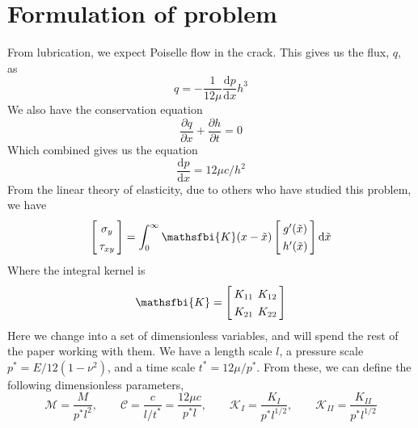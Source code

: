 \documentclass{jfm}
\newcommand{\mrd}{\mathrm{d}}
\begin{document}
\section{Formulation of problem}\label{sec:formulation_of_problem}
From lubrication, we expect Poiselle flow in the crack. This gives us the
flux, $q$, as 
\begin{equation}
q = - \frac{1}{12\mu}\frac{\mrd p}{\mrd x}h^3
\end{equation}
We also have the conservation equation
%
\begin{equation}
\frac{\partial q}{\partial x} + \frac{\partial h}{\partial t} = 0 
\end{equation}
Which combined gives us the equation
\begin{equation}
\frac{\mrd p}{\mrd x} = 12\mu c / h^2
\end{equation}
From the linear theory of elasticity, due to others who have studied this 
problem, we have
\begin{equation}
\setlength{\arraycolsep}{2pt}
\left[ \begin{array}{c} 
\sigma_y \\ \tau_{xy}
\end{array} \right]
= \int_0^{\infty} \mathsfbi{K}(x - \tilde{x}) 
\left[ \begin{array}{c} 
g'(\tilde{x}) \\ h'(\tilde{x})
\end{array} \right]
\mrd \tilde{x} 
\end{equation}
%
Where the integral kernel is
\begin{equation}
\setlength{\arraycolsep}{2pt}
\renewcommand{\arraystretch}{1.3}
\mathsfbi{K} = \left[
\begin{array}{ccccc}
  K_{11}  &  K_{12}  \\
K_{21} & K_{22} \\
\end{array}  \right] 
\end{equation}
Here we change into a set of dimensionless variables, and will spend the 
rest of the paper working with them.
We have a length scale $l$, a pressure scale $p^* = E/12(1-\nu^2)$, and a
time scale $t^* = 12\mu /p^*$.
From these, we can define the following dimensionless parameters,
\begin{equation}
\mathcal{M} = \frac{M}{p^* l^2}, \qquad \mathcal{C} = \frac{c}{l/t^*}
= \frac{12\mu c}{p^* l}, \qquad \mathcal{K}_I = \frac{K_I}{p^* l^{1/2}},
\qquad \mathcal{K}_{II} = \frac{K_{II}}{p^* l^{1/2}} 
\end{equation}
\end{document}
